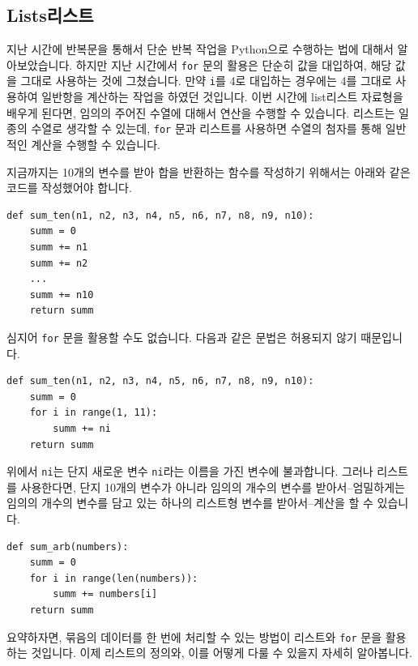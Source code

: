 \documentclass[../main.tex]{subfiles}
\begin{document}
\subsection{Lists리스트}
지난 시간에 반복문을 통해서 단순 반복 작업을 Python으로 수행하는 법에 대해서 알아보았습니다.
하지만 지난 시간에서 \texttt{for} 문의 활용은 단순히 값을 대입하여, 해당 값을 그대로 사용하는 것에 그쳤습니다.
만약 \texttt{i}를 4로 대입하는 경우에는 4를 그대로 사용하여 일반항을 계산하는 작업을 하였던 것입니다.
이번 시간에 list리스트 자료형을 배우게 된다면, 임의의 주어진 수열에 대해서 연산을 수행할 수 있습니다.
리스트는 일종의 수열로 생각할 수 있는데, \texttt{for} 문과 리스트를 사용하면 수열의 첨자를 통해 일반적인 계산을 수행할 수 있습니다.

지금까지는 10개의 변수를 받아 합을 반환하는 함수를 작성하기 위해서는 아래와 같은 코드를 작성했어야 합니다.
\begin{verbatim}
def sum_ten(n1, n2, n3, n4, n5, n6, n7, n8, n9, n10):
    summ = 0
    summ += n1
    summ += n2
    ...
    summ += n10
    return summ
\end{verbatim}
심지어 \texttt{for} 문을 활용할 수도 없습니다.
다음과 같은 문법은 허용되지 않기 때문입니다.
\begin{verbatim}
def sum_ten(n1, n2, n3, n4, n5, n6, n7, n8, n9, n10):
    summ = 0
    for i in range(1, 11):
        summ += ni
    return summ
\end{verbatim}
위에서 \texttt{ni}는 단지 새로운 변수 \texttt{ni}라는 이름을 가진 변수에 불과합니다.
그러나 리스트를 사용한다면, 단지 10개의 변수가 아니라 임의의 개수의 변수를 받아서--엄밀하게는 임의의 개수의 변수를 담고 있는 하나의 리스트형 변수를 받아서--계산을 할 수 있습니다.
\begin{verbatim}
def sum_arb(numbers):
    summ = 0
    for i in range(len(numbers)):
        summ += numbers[i]
    return summ
\end{verbatim}

요약하자면, 묶음의 데이터를 한 번에 처리할 수 있는 방법이 리스트와 \texttt{for} 문을 활용하는 것입니다.
이제 리스트의 정의와, 이를 어떻게 다룰 수 있을지 자세히 알아봅니다.
\end{document}
